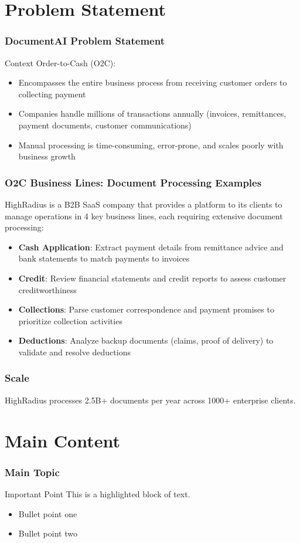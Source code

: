 \documentclass{beamer}
\begin{document}
\section{Problem Statement}

\begin{frame}
\frametitle{DocumentAI Problem Statement}
\begin{block}{Context}
Order-to-Cash (O2C):
\begin{itemize}
    \item Encompasses the entire business process from receiving customer orders to collecting payment
    \item Companies handle millions of transactions annually (invoices, remittances, payment documents, customer communications)
    \item Manual processing is time-consuming, error-prone, and scales poorly with business growth
\end{itemize}
\end{block}
\end{frame}

\begin{frame}
\frametitle{O2C Business Lines: Document Processing Examples}
HighRadius is a B2B SaaS company that provides a platform to its clients to manage operations in 4 key business lines, each requiring extensive document processing:

\begin{itemize}
    \item \textbf{Cash Application}: Extract payment details from remittance advice and bank statements to match payments to invoices
    \item \textbf{Credit}: Review financial statements and credit reports to assess customer creditworthiness
    \item \textbf{Collections}: Parse customer correspondence and payment promises to prioritize collection activities
    \item \textbf{Deductions}: Analyze backup documents (claims, proof of delivery) to validate and resolve deductions
\end{itemize}
\end{frame}

\begin{frame}
\frametitle{Scale}
HighRadius processes 2.5B+ documents per year across 1000+ enterprise clients.
\end{frame}

\section{Main Content}
\begin{frame}
\frametitle{Main Topic}
\begin{block}{Important Point}
This is a highlighted block of text.
\end{block}

\begin{itemize}
    \item Bullet point one
    \item Bullet point two
\end{itemize}
\end{frame}
\end{document}
